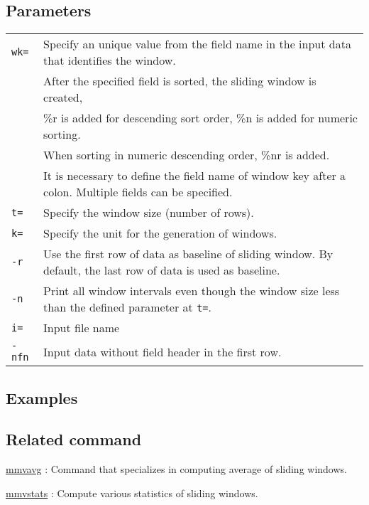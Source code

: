 \subsection*{Parameters}
\begin{table}[htbp]
{\small
\begin{tabular}{ll}

\verb|wk=|   & Specify an unique value from the field name in the input data that identifies the window. \\
	 & After the specified field is sorted, the sliding window is created, \\
	  & \%r is added for descending sort order, \%n is added for numeric sorting. \\
	   & When sorting in numeric descending order, \%nr is added. \\
             & It is necessary to define the field name of window key after a colon. Multiple fields can be specified.  \\
\verb|t=|    & Specify the window size (number of rows). \\
\verb|k=|    & Specify the unit for the generation of windows.\\
\verb|-r|    & Use the first row of data as baseline of sliding window. By default, the last row of data is used as baseline.  \\
\verb|-n|    & Print all window intervals even though the window size less than the defined parameter at  \verb|t=|. \\
\verb|i=|    & Input file name\\
\verb|-nfn|  & Input data without  field header in the first row.\\
\end{tabular} 
}
\end{table} 

\subsection*{Examples}


\subsection*{Related command}
\hyperref[sect:mmvavg] {mmvavg} : Command that specializes in computing average of sliding windows.

\hyperref[sect:mmvstats] {mmvstats} : Compute various statistics of sliding windows.  


%

